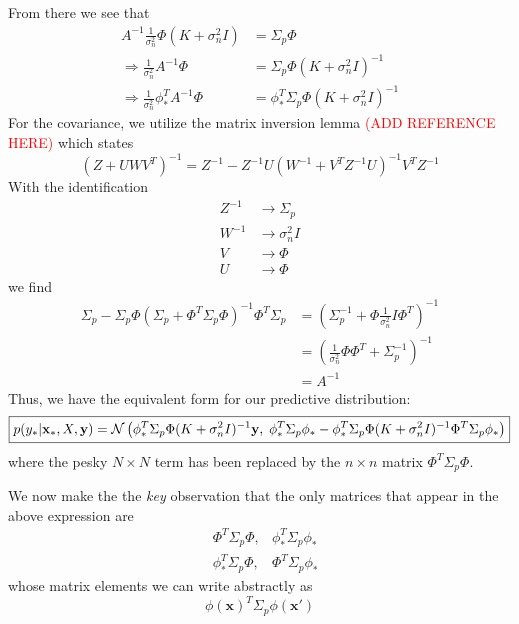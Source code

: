 From there we see that
\begin{align}
    A^{-1}\frac{1}{\sigma_n^2}\Phi\left(K+\sigma_n^2I\right) &= \Sigma_p\Phi \\
    \Rightarrow \frac{1}{\sigma_n^2}A^{-1}\Phi &= \Sigma_p\Phi\left(K + \sigma_n^2I\right)^{-1} \\
    \Rightarrow \frac{1}{\sigma_n^2}\phi_*^TA^{-1}\Phi &= \phi_*^T\Sigma_p\Phi\left(K + \sigma_n^2I\right)^{-1}
\end{align}
For the covariance, we utilize the matrix inversion lemma \textcolor{red}{(ADD REFERENCE HERE)} which states
\begin{equation}
    (Z + UWV^T)^{-1} = Z^{-1} - Z^{-1}U(W^{-1} + V^TZ^{-1}U)^{-1}V^TZ^{-1}
\end{equation}
With the identification
\begin{align}
    Z^{-1} &\to \Sigma_p \\
    W^{-1} &\to \sigma_n^2I \\
    V &\to \Phi \\
    U &\to \Phi
\end{align}
we find
\begin{align}
    \Sigma_p - \Sigma_p\Phi\left(\Sigma_p + \Phi^T\Sigma_p\Phi \right)^{-1}\Phi^T\Sigma_p  &= \left(\Sigma_p^{-1} + \Phi\frac{1}{\sigma_n^2}I\Phi^T\right)^{-1}\\
    &= \left(\frac{1}{\sigma_n^2}\Phi\Phi^T + \Sigma_p^{-1}\right)^{-1}  \\
    &= A^{-1}
\end{align}
Thus, we have the equivalent form for our predictive distribution:
\begin{equation}
    \boxed{p(y_*\vert \mathbf{x}_*, X, \mathbf{y}) =\\ \mathcal{N}\left( \phi_*^T\Sigma_p\Phi(K+\sigma_n^2I)^{-1}\mathbf{y}, \; \phi_*^T\Sigma_p\phi_* - \phi_*^T\Sigma_p\Phi(K+\sigma_n^2I)^{-1}\Phi^T\Sigma_p\phi_*\right)}
\end{equation}
where the pesky $N\times N$ term has been replaced by the $n\times n$ matrix $\Phi^T\Sigma_p\Phi$.


We now make the the \textit{key} observation that the only matrices that appear in the above expression are
\begin{align}
    &\Phi^T\Sigma_p\Phi, &\phi_*^T\Sigma_p\phi_* \\
    &\phi_*^T\Sigma_p\Phi, &\Phi^T\Sigma_p\phi_*
\end{align}
whose matrix elements we can write abstractly as
\begin{equation}
    \phi(\mathbf{x})^T\Sigma_p\phi(\mathbf{x}')
\end{equation}

